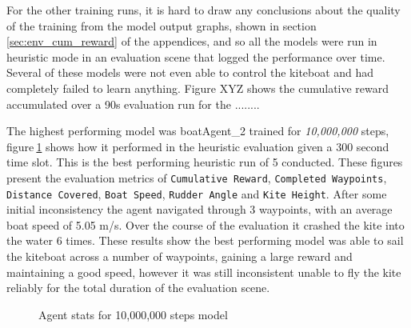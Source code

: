 For the other training runs, it is hard to draw any conclusions about the quality of the training from the model output graphs, shown in section$~$\ref{sec:env_cum_reward} of the appendices, and so all the models were run in heuristic mode in an evaluation scene that logged the performance over time. Several of these models were not even able to control the kiteboat and had completely failed to learn anything. Figure XYZ shows the cumulative reward accumulated over a 90s evaluation run for the ........

The highest performing model was boatAgent\_2 trained for \textit{10,000,000} steps, figure$~$\ref{agent_stats} shows how it performed in the heuristic evaluation given a 300 second time slot. This is the best performing heuristic run of 5 conducted. These figures present the evaluation metrics of \texttt{Cumulative Reward}, \texttt{Completed Waypoints}, \texttt{Distance Covered}, \texttt{Boat Speed}, \texttt{Rudder Angle} and \texttt{Kite Height}. After some initial inconsistency the agent navigated through 3 waypoints, with an average boat speed of 5.05 m/s. Over the course of the evaluation it crashed the kite into the water 6 times. These results show the best performing model was able to sail the kiteboat across a number of waypoints, gaining a large reward and maintaining a good speed, however it was still inconsistent unable to fly the kite reliably for the total duration of the evaluation scene. 
\begin{figure}
    \centering
    \caption{Agent stats for 10,000,000 steps model}\label{agent_stats}
\end{figure}

